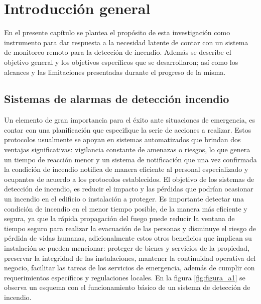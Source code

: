 
\chapter{Introducción general} %

\label{Chapter1} %
\label{IntroGeneral}


\newcommand{\keyword}[1]{\textbf{#1}}
\newcommand{\tabhead}[1]{\textbf{#1}}
\newcommand{\code}[1]{\texttt{#1}}
\newcommand{\file}[1]{\texttt{\bfseries#1}}
\newcommand{\option}[1]{\texttt{\itshape#1}}
\newcommand{\grados}{$^{\circ}$}


En el presente capítulo se plantea el propósito de esta investigación como instrumento para dar respuesta a la necesidad latente de contar con un sistema de monitoreo remoto para la detección de incendio. Además se describe el objetivo general y los objetivos específicos que se desarrollaron; así como los alcances y las limitaciones presentadas durante el progreso de la misma.

\section{Sistemas de alarmas de detección incendio}

Un elemento de gran importancia para el éxito ante situaciones de emergencia, es contar con una planificación que especifique la serie de acciones a realizar. Estos protocolos usualmente se apoyan en sistemas automatizados que brindan dos ventajas significativas: vigilancia constante de amenazas o riesgos, lo que genera un tiempo de reacción menor  y un sistema de notificación que una vez confirmada la condición de incendio notifica de manera eficiente al personal especializado y ocupantes de acuerdo a los protocolos establecidos.
El objetivo de los sistemas de detección de incendio, es reducir el impacto y las pérdidas que podrían ocasionar un incendio en el edificio o instalación a proteger. Es importante detectar una condición de incendio en el menor tiempo posible, de la manera más eficiente y segura, ya que la rápida propagación del fuego puede reducir la ventana de tiempo seguro para realizar la evacuación de las personas y disminuye el riesgo de pérdida de vidas humanas, adicionalmente estos otros beneficios que implican su instalación se pueden mencionar: proteger de bienes y servicios de la propiedad, preservar la integridad de las instalaciones, mantener la continuidad operativa del negocio, facilitar las tareas de los servicios de emergencia, además de cumplir con requerimientos específicos y regulaciones locales. En la figura \ref{fig:figura_a1} se observa un esquema con el funcionamiento básico de un sistema de detección de incendio.  

